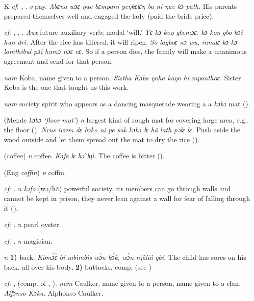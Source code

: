 \begin{letter}{K}
 \textit{cf}: , . \textit{v} pay. \textit{Abɛna wɔɛ ŋae bɛmpani yeŋkɛlɛŋ ba ni ŋae kɔ path.} His parents prepared themselves well and engaged the lady (paid the bride price).

 \textit{cf}: , , . \textit{Aux} future auxiliary verb; modal ‘will.' \textit{Yɛ kɔ koŋ gbemɔɛ, kɔ koŋ gbo kɔi hun dri.} After the rice has tillered, it will ripen. \textit{So lagboɛ nɔ wu, ramdɛ kɔ kɔ lomthibul pɔi humɔ nɔɛ vɛ.} So if a person dies, the family will make a unanimous agreement and send for that person.

 \textit{nam} Koba, name given to a person. \textit{Sistha Kɔba ŋaha kaŋa hi mpanthoɛ.} Sister Koba is the one that taught us this work.

 \textit{nam} society spirit who appears as a dancing masquerade wearing a a \textit{kɔbɔ} mat (\citealt{Pichl1967}). 

 (Mende \textit{kɔbɔ ‘floor mat'}) \textit{n} largest kind of rough mat for covering large area, e.g., the floor (\citealt{Pichl1967}). \textit{Nrus iwɔm dɛ bɔko ni pe sak kɔbɔ lɛ hã lath pəlɛ lɛ.} Push aside the wood outside and let them spread out the mat to dry the rice (\citealt{Pichl1967}). 

 (coffee) \textit{n} coffee. \textit{Kɔfe lɛ hɔ̃ lo̹l.} The coffee is bitter (\citealt{Pichl1967}).

 (Eng \textit{coffin}) \textit{n} coffin.

 \textit{cf}: . \textit{n} \textit{kɔfõ} (wɔ/hã) powerful society, its members can go through walls and cannot be kept in prison, they never lean against a wall for fear of falling through it (\citealt{Pichl1967}). 

 \textit{cf}: . \textit{n} pearl oyster.

 \textit{cf}: . \textit{n} magician.

 \textit{n} \textbf{1)} back. \textit{Kòmɔ̀ɛ̀ bí mbìmbìs wɔ̀n kɔ́k, wɔ̀n njàlàì gbí.} The child has sores on his back, all over his body. \textbf{2)} buttocks. comp.  (see ) 

 \textit{cf}: ,  (comp. of , ). \textit{nam} Caulker, name given to a person, name given to a clan. \textit{Alfɔnso Kɔka.} Alphonso Caulker.


\end{letter}
